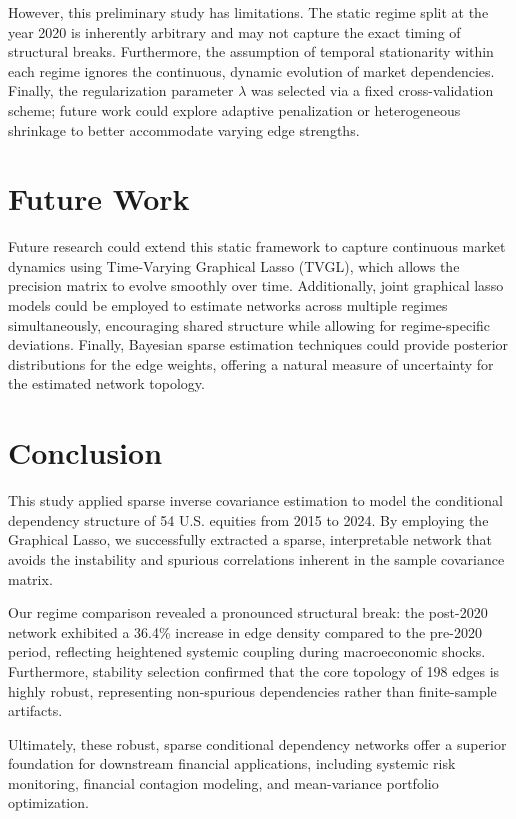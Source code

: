 \documentclass[11pt]{article}
\begin{document}
However, this preliminary study has limitations. The static regime split at the year 2020 is inherently arbitrary and may not capture the exact timing of structural breaks. Furthermore, the assumption of temporal stationarity within each regime ignores the continuous, dynamic evolution of market dependencies. Finally, the regularization parameter $\lambda$ was selected via a fixed cross-validation scheme; future work could explore adaptive penalization or heterogeneous shrinkage to better accommodate varying edge strengths.

\section{Future Work}
Future research could extend this static framework to capture continuous market dynamics using Time-Varying Graphical Lasso (TVGL), which allows the precision matrix to evolve smoothly over time. Additionally, joint graphical lasso models could be employed to estimate networks across multiple regimes simultaneously, encouraging shared structure while allowing for regime-specific deviations. Finally, Bayesian sparse estimation techniques could provide posterior distributions for the edge weights, offering a natural measure of uncertainty for the estimated network topology.

\section{Conclusion}
This study applied sparse inverse covariance estimation to model the conditional dependency structure of 54 U.S. equities from 2015 to 2024. By employing the Graphical Lasso, we successfully extracted a sparse, interpretable network that avoids the instability and spurious correlations inherent in the sample covariance matrix.

Our regime comparison revealed a pronounced structural break: the post-2020 network exhibited a 36.4\% increase in edge density compared to the pre-2020 period, reflecting heightened systemic coupling during macroeconomic shocks. Furthermore, stability selection confirmed that the core topology of 198 edges is highly robust, representing non-spurious dependencies rather than finite-sample artifacts.

Ultimately, these robust, sparse conditional dependency networks offer a superior foundation for downstream financial applications, including systemic risk monitoring, financial contagion modeling, and mean-variance portfolio optimization.



\end{document}
